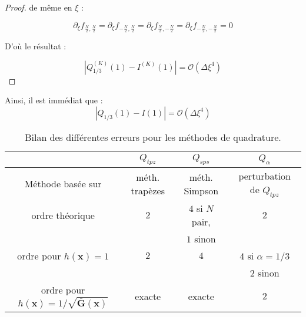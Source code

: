 \begin{proof}
de même en $\xi$ :

\begin{equation}
\partial_{\xi} f_{\frac{N}{2},\frac{N}{2}} = \partial_{\xi} f_{-\frac{N}{2},\frac{N}{2}} = \partial_{\xi} f_{\frac{N}{2},-\frac{N}{2}} = \partial_{\xi} f_{-\frac{N}{2},-\frac{N}{2}} = 0 
\end{equation}

D'où le résultat :

\begin{equation}
|Q_{1/3}^{(K)}(1) - I^{(K)}(1) | = \mathcal{O}\left( \Delta \xi^4 \right)
\end{equation}

\end{proof}

\begin{corollaire}
Ainsi, il est immédiat que :
\begin{equation}
|Q_{1/3}(1) - I(1) | = \mathcal{O}\left( \Delta \xi^4 \right)
\end{equation}
\end{corollaire}






\begin{table}[ht]
\begin{center}
\begin{tabular}{c||c|c|c}
    & $Q_{tpz}$ & $Q_{sps}$ & $Q_{\alpha}$ \\
\hline
\hline
Méthode basée sur & méth. trapèzes & méth. Simpson & perturbation de $Q_{tpz}$ \\
\hline
ordre théorique & $2$ & $4$ si $N$ pair, & $2$ \\
                &     &      $1$ sinon   &     \\
\hline
ordre pour $h(\mathbf{x})=1$ &  $2$ & $4$ & $4$ si $\alpha=1/3$ \\
                             &      &     & $2$ sinon    \\
\hline
ordre pour $h(\mathbf{x})=1/\sqrt{\overline{\mathbf{G}}(\mathbf{x})}$ &  exacte & exacte & $2$
\end{tabular}
\end{center}
\caption{Bilan des différentes erreurs pour les méthodes de quadrature.}
\end{table}























